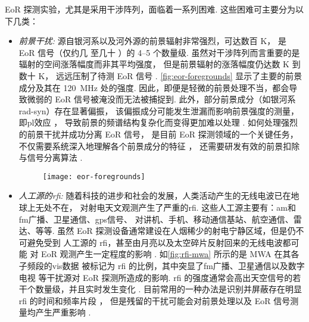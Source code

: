 EoR 探测实验，尤其是采用干涉阵列，面临着一系列困难.
这些困难可主要分为以下几类：
\begin{itemize}
\item
\emph{前景干扰:}
源自银河系以及河外源的前景辐射非常强烈，可达数百 \si{\kelvin}，
是 EoR 信号（仅约几 \si{\mK} 至几十 \si{\mK}）的 \numrange{4}{5} 个数量级.
虽然对干涉阵列而言重要的是辐射的空间涨落幅度而非其平均强度，
但是前景辐射的涨落幅度仍达数 \si{\kelvin} 到数十 \si{\kelvin}，
远远压制了待测 EoR 信号 \cite{zaroubi2013}.
\autoref{fig:eor-foregrounds} 显示了主要的前景成分及其在
\SI{120}{\MHz} 处的强度.
因此，即便是轻微的前景处理不当，都会导致微弱的 EoR 信号被淹没而无法被捕捉到.
此外，部分前景成分（如银河系\ac{rad-syn}）存在显著偏振，
该偏振成分可能发生泄漏而影响前景强度的测量，即\ac{pl}效应 \cite{cotton1999}，
导致前景的频谱结构复杂化而变得更加难以处理
\cite{jelic2014,asad2015,asad2016,asad2018,gehlot2018}.
如何处理强烈的前景干扰并成功分离 EoR 信号，
是目前 EoR 探测领域的一个关键任务，
不仅需要系统深入地理解各个前景成分的特征
\cite{jelic2008,jelic2010,wang2010,liu2012,offringa2016,
  carroll2016,murray2017,procopio2017,spinelli2018}，
还需要研发有效的前景扣除与信号分离算法
\cite{wang2006,jelic2008,harker2009,liu2009fgrm,chapman2012,chapman2013,
  gu2013,wang2013,bonaldi2015,chapman2015,chapman2016,mertens2018}.

\begin{figure}[tbp]
  \centering
  \texttt{[image: eor-foregrounds]}
  \label{fig:eor-foregrounds}
\end{figure}

\item
\emph{人工源的\acl{rfi}:}
随着科技的进步和社会的发展，人类活动产生的无线电波已在地球上无处不在，
对射电天文观测产生了严重的\acf{rfi}.
这些人工源主要有：\ac{am}和\ac{fm}广播、卫星通信、\ac{gps}信号、
对讲机、手机、移动通信基站、航空通信、雷达、等等.
虽然 EoR 探测设备通常建设在人烟稀少的射电宁静区域，但是仍不可避免受到
人工源的 \ac{rfi}，甚至由月亮以及太空碎片反射回来的无线电波都可能
对 EoR 观测产生一定程度的影响 \cite{mckinley2013,tingay2013rfi}.
如\autoref{fig:rfi-mwa} 所示的是 MWA 在其各子频段的\ac{vis}数据
被标记为 \ac{rfi} 的比例，其中突显了\ac{fm}广播、卫星通信以及数字电视
等干扰源对 EoR 探测所造成的影响.
\ac{rfi} 的强度通常会高出天空信号的若干个数量级，并且实时发生变化 \cite{bentum2011}.
目前常用的一种办法是识别并屏蔽存在明显 \ac{rfi} 的时间和频率片段
\cite{fridman2001,offringa2010,offringa2012,prasad2012,akeret2017}，
但是残留的干扰可能会对前景处理以及 EoR 信号测量均产生严重影响 \cite{offringa2015}.


\end{itemize}
